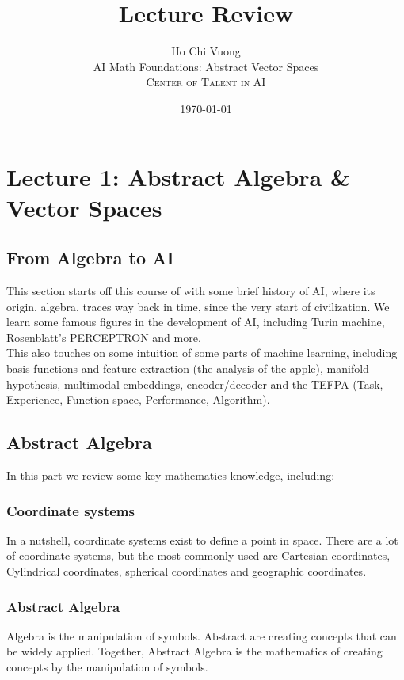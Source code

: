 \documentclass[12pt]{article}
\title{Lecture Review} %
\author{Ho Chi Vuong\\ %
AI Math Foundations: Abstract Vector Spaces\\ %
\textsc{Center of Talent in AI}
}
\date{\today} %
\begin{document}
   
\maketitle


\section*{Lecture 1: Abstract Algebra \& Vector Spaces}


\subsection*{From Algebra to AI}
This section starts off this course of with some brief history of AI, where its origin, algebra, traces way back in time, since the very start of civilization. We learn some famous figures in the development of AI, including Turin machine, Rosenblatt's PERCEPTRON and more.\\
This also touches on some intuition of some parts of machine learning, including basis functions and feature extraction (the analysis of the apple), manifold hypothesis, multimodal embeddings, encoder/decoder and the TEFPA (Task, Experience, Function space, Performance, Algorithm).







\subsection*{Abstract Algebra}
In this part we review some key mathematics knowledge, including:
\subsubsection*{Coordinate systems}
In a nutshell, coordinate systems exist to define a point in space. There are a lot of coordinate systems, but the most commonly used are Cartesian coordinates, Cylindrical coordinates, spherical coordinates and geographic coordinates.\\

\subsubsection*{Abstract Algebra}
Algebra is the manipulation of symbols. Abstract are creating concepts that can be widely applied. Together, Abstract Algebra is the mathematics of creating concepts by the manipulation of symbols. 
\end{document}
